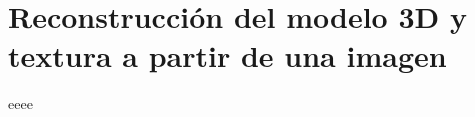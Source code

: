 \chapter{Reconstrucción del modelo 3D y textura a partir de una imagen}
\label{Reconstrucción}

eeee
